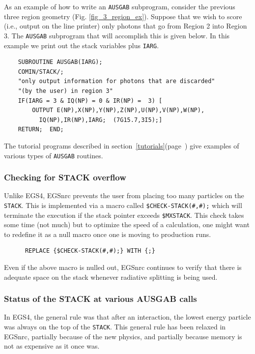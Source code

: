 As an example of how to write an {\tt AUSGAB} subprogram, consider the previous
three region geometry (Fig. \ref{fig_3_region_ex}).  Suppose that we wish to
score (i.e., output on the line printer) only photons that go from Region 2
into Region 3.  The {\tt AUSGAB} subprogram that will accomplish this is given
below.  In this example we print out the stack variables plus {\tt IARG}.
\begin{verbatim}
    SUBROUTINE AUSGAB(IARG);
    COMIN/STACK/;
    "only output information for photons that are discarded"
    "(by the user) in region 3"
    IF(IARG = 3 & IQ(NP) = 0 & IR(NP) =  3) [
        OUTPUT E(NP),X(NP),Y(NP),Z(NP),U(NP),V(NP),W(NP),
          IQ(NP),IR(NP),IARG;  (7G15.7,3I5);]
    RETURN;  END;
\end{verbatim}
The tutorial programs described in
section~\ref{tutorials}(page~\pageref{tutorials}) give examples of various
types of {\tt AUSGAB} routines.

\subsubsection{Checking for STACK overflow}
 
Unlike  EGS4, EGSnrc prevents the user from placing
too many particles on the {\tt STACK}. This is implemented via a macro
called {\tt \$CHECK-STACK(\#,\#);} which will terminate the execution if the
stack pointer exceeds {\tt \$MXSTACK}. This check takes some time (not much)
but to optimize the speed of a calculation, one might want to redefine it
as a null macro once one is moving to production runs.
\begin{verbatim}
      REPLACE {$CHECK-STACK(#,#);} WITH {;}
\end{verbatim}
Even if the above macro is nulled out, EGSnrc continues to verify that
there is adequate space on the stack whenever radiative splitting is being
used.

\subsubsection{Status of the STACK at various AUSGAB calls}
\label{stack_status}
In EGS4, the general rule was that after an interaction, the lowest energy
particle was always on the top of the {\tt STACK}. This general rule has
been relaxed in EGSnrc, partially because of the new physics, and partially
because memory is not as expensive as it once was.

